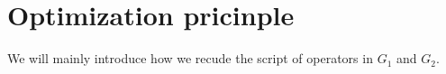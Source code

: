 \section{Optimization pricinple} \label{sec:optimization-pricinple}

We will mainly introduce how we recude the script of operators in $G_1$ and $G_2$.



